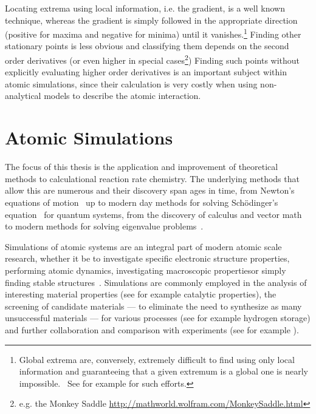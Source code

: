 Locating extrema using local information, i.e. the gradient, is a well known technique\citemiss, whereas the gradient is simply followed in the appropriate direction (positive for maxima and negative for minima) until it vanishes.\footnote{Global extrema are, conversely, extremely difficult to find using only local information and guaranteeing that a given extremum is a global one is nearly impossible.~\cite{Stillinger1999} See for example \cite{Wang2010, Wales1999, Pickard2011, Oganov2008, Kirkpatrick1983, Johnston2003, Fischer2006} for such efforts.}
Finding other stationary points is less obvious and classifying them depends on the second order derivatives (or even higher in special cases\footnote{e.g. the Monkey Saddle \url{http://mathworld.wolfram.com/MonkeySaddle.html}})
Finding such points without explicitly evaluating higher order derivatives is an important subject within atomic simulations, since their calculation is very costly when using non-analytical models to describe the atomic interaction.

\section{Atomic Simulations}
The focus of this thesis is the application and improvement of theoretical methods to calculational reaction rate chemistry.
The underlying methods that allow this are numerous and their discovery span ages in time, from Newton's equations of motion~\cite{newton-latin} up to modern day methods for solving Sch\"odinger's equation~\cite{schrodinger-equation-1926} for quantum systems\cite{hohenberg-kohn-1964, gpaw-review-2010, dacapo-1999}, from the discovery of calculus and vector math to modern methods for solving eigenvalue problems~\cite{eigenvalue-problems-2000}.

Simulations of atomic systems are an integral part of modern atomic scale research, whether it be to investigate specific electronic structure properties\citemiss, performing atomic dynamics\citemiss, investigating macroscopic properties\citemiss or simply finding stable structures~\citemiss.
Simulations are commonly employed in the analysis of interesting material properties (see for example catalytic properties\citemiss), the screening of candidate materials --- to eliminate the need to synthesize as many unsuccessful materials --- for various processes (see for example hydrogen storage\cite{summer-school-paper-2009}) and further collaboration and comparison with experiments (see for example \citemiss).

